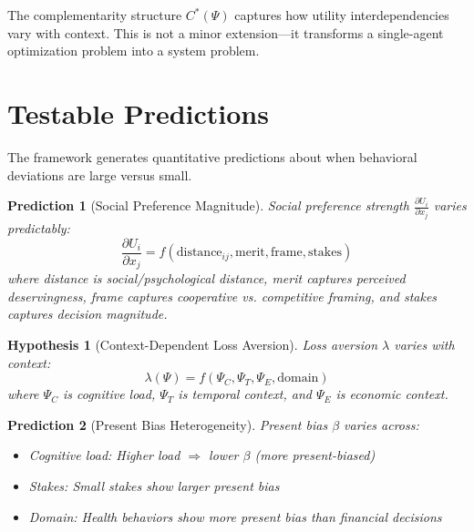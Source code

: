 \documentclass[12pt]{article}
\newtheorem{hypothesis}{Hypothesis}
\newtheorem{prediction}{Prediction}
\begin{document}
The complementarity structure $C^*(\Psi)$ captures how utility interdependencies vary with context. This is not a minor extension---it transforms a single-agent optimization problem into a system problem.



\section{Testable Predictions}
\label{sec:predictions}

The framework generates quantitative predictions about when behavioral deviations are large versus small.

\begin{prediction}[Social Preference Magnitude]
Social preference strength $\frac{\partial U_i}{\partial x_j}$ varies predictably:
\begin{equation}
\frac{\partial U_i}{\partial x_j} = f(\text{distance}_{ij}, \text{merit}, \text{frame}, \text{stakes})
\end{equation}
where distance is social/psychological distance, merit captures perceived deservingness, frame captures cooperative vs. competitive framing, and stakes captures decision magnitude.
\end{prediction}

\begin{hypothesis}[Context-Dependent Loss Aversion]
Loss aversion $\lambda$ varies with context:
\begin{equation}
\lambda(\Psi) = f(\Psi_C, \Psi_T, \Psi_E, \text{domain})
\end{equation}
where $\Psi_C$ is cognitive load, $\Psi_T$ is temporal context, and $\Psi_E$ is economic context.
\end{hypothesis}

\begin{prediction}[Present Bias Heterogeneity]
Present bias $\beta$ varies across:
\begin{itemize}
    \item Cognitive load: Higher load $\Rightarrow$ lower $\beta$ (more present-biased)
    \item Stakes: Small stakes show larger present bias
    \item Domain: Health behaviors show more present bias than financial decisions
\end{itemize}
\end{prediction}
\end{document}

